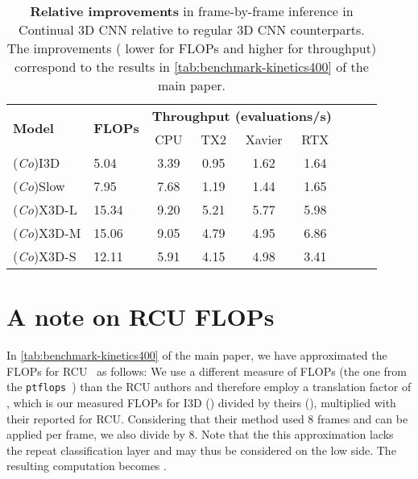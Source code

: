 \documentclass[runningheads]{llncs}
\begin{document}
\begin{table}
\begin{center}
\begin{tabular}{llccccccc}
    \toprule
    \multirow{2}{*}{\textbf{Model}} 
    &\multirow{2}{*}{\textbf{FLOPs}}  
    &\multicolumn{4}{c}{\textbf{Throughput (evaluations/s)}}
        \\ \cline{3-6}
        &&CPU & TX2  &Xavier &RTX
    \\
    \midrule             (\textit{Co})I3D     &5.04   & 3.39  & 0.95  & 1.62  & 1.64 \\
    (\textit{Co})Slow    &7.95   & 7.68  & 1.19  & 1.44  & 1.65 \\
    (\textit{Co})X3D-L   &15.34  & 9.20  & 5.21  & 5.77  & 5.98 \\
    (\textit{Co})X3D-M   &15.06  & 9.05  & 4.79  & 4.95  & 6.86 \\
    (\textit{Co})X3D-S   &12.11  & 5.91  & 4.15  & 4.98  & 3.41 \\
    \bottomrule
\end{tabular}
\end{center}
\caption{\textbf{Relative improvements} in frame-by-frame inference in Continual 3D CNN relative to regular 3D CNN counterparts. The improvements ( lower for FLOPs and  higher for throughput) correspond to the results in \cref{tab:benchmark-kinetics400} of the main paper.}
\label{tab:relative-results}
\end{table}




\section{A note on RCU FLOPs} \label{apx:rcu}
In \cref{tab:benchmark-kinetics400} of the main paper, we have approximated the FLOPs for RCU~\cite{singh2019recurrent} as follows:
We use a different measure of FLOPs (the one from the \texttt{ptflops}~\cite{sovrasov2020ptflops}) than the RCU authors and therefore employ a translation factor of , which is our measured FLOPs for I3D () divided by theirs (), multiplied with their reported  for RCU. Considering that their method used 8 frames and can be applied per frame, we also divide by 8. 
Note that the this approximation lacks the repeat classification layer and may thus be considered on the low side. The resulting computation becomes 
. 
\end{document}
